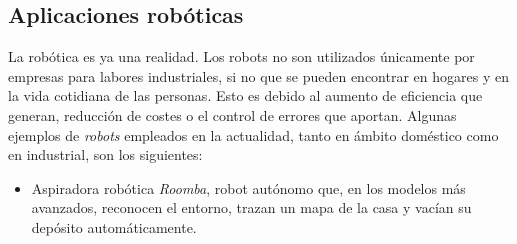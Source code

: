 \subsection{Aplicaciones robóticas}

La robótica es ya una realidad. Los robots no son utilizados únicamente por empresas para labores industriales, si no que se pueden encontrar en hogares y en la vida cotidiana de las personas. Esto es debido al aumento de eficiencia que generan, reducción de costes o el control de errores que aportan.  Algunas ejemplos de \textit{robots} empleados en la actualidad, tanto en ámbito doméstico como en industrial, son los siguientes: 
\begin{itemize}
    \item Aspiradora robótica \textit{Roomba}, robot autónomo que, en los modelos más avanzados, reconocen el entorno, trazan un mapa de la casa y vacían su depósito automáticamente.
    
    
    \begin{figure}[H]
\centering

\end{figure}


\end{itemize}

